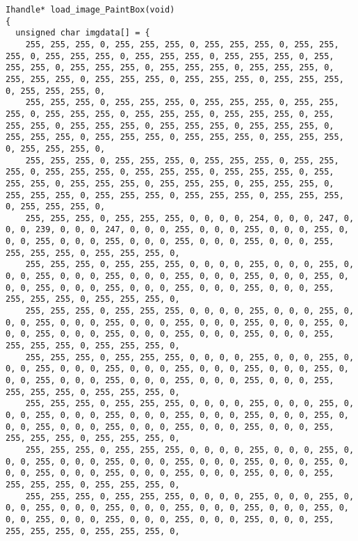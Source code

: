 \documentclass{ctexart}
\begin{document}
\begin{lstlisting}
Ihandle* load_image_PaintBox(void)
{
  unsigned char imgdata[] = {
    255, 255, 255, 0, 255, 255, 255, 0, 255, 255, 255, 0, 255, 255, 255, 0, 255, 255, 255, 0, 255, 255, 255, 0, 255, 255, 255, 0, 255, 255, 255, 0, 255, 255, 255, 0, 255, 255, 255, 0, 255, 255, 255, 0, 255, 255, 255, 0, 255, 255, 255, 0, 255, 255, 255, 0, 255, 255, 255, 0, 255, 255, 255, 0,
    255, 255, 255, 0, 255, 255, 255, 0, 255, 255, 255, 0, 255, 255, 255, 0, 255, 255, 255, 0, 255, 255, 255, 0, 255, 255, 255, 0, 255, 255, 255, 0, 255, 255, 255, 0, 255, 255, 255, 0, 255, 255, 255, 0, 255, 255, 255, 0, 255, 255, 255, 0, 255, 255, 255, 0, 255, 255, 255, 0, 255, 255, 255, 0,
    255, 255, 255, 0, 255, 255, 255, 0, 255, 255, 255, 0, 255, 255, 255, 0, 255, 255, 255, 0, 255, 255, 255, 0, 255, 255, 255, 0, 255, 255, 255, 0, 255, 255, 255, 0, 255, 255, 255, 0, 255, 255, 255, 0, 255, 255, 255, 0, 255, 255, 255, 0, 255, 255, 255, 0, 255, 255, 255, 0, 255, 255, 255, 0,
    255, 255, 255, 0, 255, 255, 255, 0, 0, 0, 0, 254, 0, 0, 0, 247, 0, 0, 0, 239, 0, 0, 0, 247, 0, 0, 0, 255, 0, 0, 0, 255, 0, 0, 0, 255, 0, 0, 0, 255, 0, 0, 0, 255, 0, 0, 0, 255, 0, 0, 0, 255, 0, 0, 0, 255, 255, 255, 255, 0, 255, 255, 255, 0,
    255, 255, 255, 0, 255, 255, 255, 0, 0, 0, 0, 255, 0, 0, 0, 255, 0, 0, 0, 255, 0, 0, 0, 255, 0, 0, 0, 255, 0, 0, 0, 255, 0, 0, 0, 255, 0, 0, 0, 255, 0, 0, 0, 255, 0, 0, 0, 255, 0, 0, 0, 255, 0, 0, 0, 255, 255, 255, 255, 0, 255, 255, 255, 0,
    255, 255, 255, 0, 255, 255, 255, 0, 0, 0, 0, 255, 0, 0, 0, 255, 0, 0, 0, 255, 0, 0, 0, 255, 0, 0, 0, 255, 0, 0, 0, 255, 0, 0, 0, 255, 0, 0, 0, 255, 0, 0, 0, 255, 0, 0, 0, 255, 0, 0, 0, 255, 0, 0, 0, 255, 255, 255, 255, 0, 255, 255, 255, 0,
    255, 255, 255, 0, 255, 255, 255, 0, 0, 0, 0, 255, 0, 0, 0, 255, 0, 0, 0, 255, 0, 0, 0, 255, 0, 0, 0, 255, 0, 0, 0, 255, 0, 0, 0, 255, 0, 0, 0, 255, 0, 0, 0, 255, 0, 0, 0, 255, 0, 0, 0, 255, 0, 0, 0, 255, 255, 255, 255, 0, 255, 255, 255, 0,
    255, 255, 255, 0, 255, 255, 255, 0, 0, 0, 0, 255, 0, 0, 0, 255, 0, 0, 0, 255, 0, 0, 0, 255, 0, 0, 0, 255, 0, 0, 0, 255, 0, 0, 0, 255, 0, 0, 0, 255, 0, 0, 0, 255, 0, 0, 0, 255, 0, 0, 0, 255, 0, 0, 0, 255, 255, 255, 255, 0, 255, 255, 255, 0,
    255, 255, 255, 0, 255, 255, 255, 0, 0, 0, 0, 255, 0, 0, 0, 255, 0, 0, 0, 255, 0, 0, 0, 255, 0, 0, 0, 255, 0, 0, 0, 255, 0, 0, 0, 255, 0, 0, 0, 255, 0, 0, 0, 255, 0, 0, 0, 255, 0, 0, 0, 255, 0, 0, 0, 255, 255, 255, 255, 0, 255, 255, 255, 0,
    255, 255, 255, 0, 255, 255, 255, 0, 0, 0, 0, 255, 0, 0, 0, 255, 0, 0, 0, 255, 0, 0, 0, 255, 0, 0, 0, 255, 0, 0, 0, 255, 0, 0, 0, 255, 0, 0, 0, 255, 0, 0, 0, 255, 0, 0, 0, 255, 0, 0, 0, 255, 0, 0, 0, 255, 255, 255, 255, 0, 255, 255, 255, 0,

\end{lstlisting}
\end{document}
